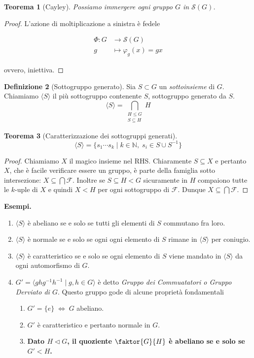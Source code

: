 \documentclass[a4paper]{article}
\newtheorem{theorem}{Teorema}[section]
\theoremstyle{remark}
\theoremstyle{definition}
\newtheorem{definition}[theorem]{Definizione}
\newcommand{\fun}[5]{
	\begin{align*}
	#1 \colon #2 &\to #3 \\
	#4 &\mapsto #5
	\end{align*}
}
\begin{document}
\begin{multicols}{2}
\begin{theorem}[Cayley]\label{Cayley}
	Possiamo immergere ogni gruppo $ G $ in $ \mathcal{S}(G) $.
\end{theorem}
\begin{proof}
	L'azione di moltiplicazione a sinistra è fedele
	 \fun{\Phi}{G}{\mathcal{S}(G)}{g}{\varphi_g(x) = gx}
	ovvero, iniettiva.
\end{proof}

\begin{definition}[Sottogruppo generato]
	Sia $ S \subset G $ un \emph{sottoinsieme} di $ G $. Chiamiamo $ \langle S \rangle $ il più sottogruppo contenente $ S $, sottogruppo generato da $ S $. \[ \langle S \rangle = \bigcap_{\substack{H \leq G \\ S \subseteq H }} H  \]
\end{definition}
\begin{theorem}[Caratterizzazione dei sottogruppi generati]
	\[ \langle S \rangle = \{ s_1 \cdots s_k \mid k \in \mathbb{N}, \; s_i \in S \cup S^{-1} \} \]
\end{theorem}
\begin{proof}
	Chiamiamo $ X $ il magico insieme nel RHS. Chiaramente $ S \subseteq X $ e pertanto $ X $, che è facile verificare essere un gruppo, è parte della famiglia sotto intersezione: $ X \subseteq \bigcap \mathcal{F} $. Inoltre se $S \subseteq H < G $ sicuramente in $ H $ compaiono tutte le $ k $-uple di $ X $ e quindi $ X < H $ per ogni sottogruppo di $ \mathcal{F} $. Dunque $ X \subseteq \bigcap\mathcal{F} $.
\end{proof}

\textbf{Esempi.}
\begin{enumerate}
	\item $ \langle S \rangle $ è abeliano se e solo se tutti gli elementi di $ S $ commutano fra loro.
	\item $ \langle S \rangle $ è normale se e solo se ogni ogni elemento di $ S $ rimane in $ \langle S \rangle $ per coniugio.
	\item $ \langle S \rangle $ è caratteristico se e solo se ogni elemento di $ S $ viene mandato in $ \langle S \rangle $ da ogni automorfismo di $ G $.
	\item $ G' = \langle ghg^{-1}h^{-1} \mid g, h \in G \rangle $ è detto \emph{Gruppo dei Commuatatori o Gruppo Derviato di $ G $}. Questo gruppo gode di alcune proprietà fondamentali
	
	\begin{enumerate}
		\item $ G' = \{ e \} \;\Leftrightarrow\; G $ abeliano.
		\item $ G' $ è caratteristico e pertanto normale in $ G $.
		\item \textbf{Dato $ H \lhd G $, il quoziente $ \faktor{G}{H} $ è abeliano se e solo se $ G' < H $.}
	

\end{enumerate}
\end{enumerate}
\end{multicols}
\end{document}
